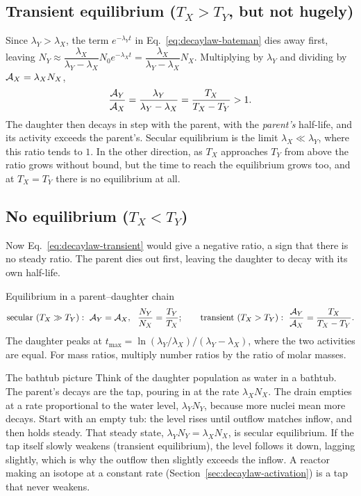 \subsection{Transient equilibrium (\texorpdfstring{$T_X>T_Y$}{TX longer than TY}, but not hugely)}
Since $\lambda_Y>\lambda_X$, the term
$e^{-\lambda_Yt}$ in Eq.~\eqref{eq:decaylaw-bateman} dies away first, leaving
$N_Y\approx\dfrac{\lambda_X}{\lambda_Y-\lambda_X}N_0e^{-\lambda_Xt}=\dfrac{\lambda_X}{\lambda_Y-\lambda_X}N_X$.
Multiplying by $\lambda_Y$ and dividing by $\mathcal{A}_X=\lambda_XN_X$,
\begin{equation}\label{eq:decaylaw-transient}
\frac{\mathcal{A}_Y}{\mathcal{A}_X}=\frac{\lambda_Y}{\lambda_Y-\lambda_X}=\frac{T_X}{T_X-T_Y}>1 .
\end{equation}
The daughter then decays in step with the parent, with the \emph{parent's} half-life, and its activity
exceeds the parent's. Secular equilibrium is the limit $\lambda_X\ll\lambda_Y$, where this ratio tends
to $1$. In the other direction, as $T_X$ approaches $T_Y$ from above the ratio grows without bound, but
the time to reach the equilibrium grows too, and at $T_X=T_Y$ there is no equilibrium at all.

\subsection{No equilibrium (\texorpdfstring{$T_X<T_Y$}{TX shorter than TY})}
Now Eq.~\eqref{eq:decaylaw-transient} would give a negative
ratio, a sign that there is no steady ratio. The parent dies out first, leaving the daughter to decay
with its own half-life.

\begin{keybox}{Equilibrium in a parent--daughter chain}
\[
\text{secular } (T_X\gg T_Y):\ \Act_Y=\Act_X,\ \ \frac{N_Y}{N_X}=\frac{T_Y}{T_X};\qquad
\text{transient } (T_X>T_Y):\ \frac{\Act_Y}{\Act_X}=\frac{T_X}{T_X-T_Y}.
\]
The daughter peaks at $t_{\max}=\ln(\lambda_Y/\lambda_X)/(\lambda_Y-\lambda_X)$, where the two
activities are equal. For mass ratios, multiply number ratios by the ratio of molar masses.
\end{keybox}

\begin{remarkbox}{The bathtub picture}
Think of the daughter population as water in a bathtub. The parent's decays are the tap, pouring in at
the rate $\lambda_XN_X$. The drain empties at a rate proportional to the water level, $\lambda_YN_Y$,
because more nuclei mean more decays. Start with an empty tub: the level rises until outflow matches
inflow, and then holds steady. That steady state, $\lambda_YN_Y=\lambda_XN_X$, is secular equilibrium.
If the tap itself slowly weakens (transient equilibrium), the level follows it down, lagging slightly,
which is why the outflow then slightly exceeds the inflow. A reactor making an isotope at a constant
rate (Section~\ref{sec:decaylaw-activation}) is a tap that never weakens.
\end{remarkbox}

